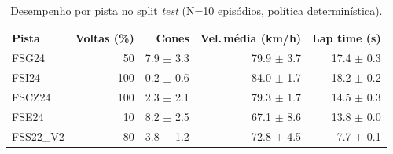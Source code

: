 \begin{table}[H]
\centering
\caption{Desempenho por pista no split \textit{test} (N=10 episódios, política determinística).}
\label{tab:per_track_test}
\begin{tabular}{lrrrr}
\toprule
\textbf{Pista} & \textbf{Voltas (\%)} & \textbf{Cones} & \textbf{Vel.\,m\'edia (km/h)} & \textbf{Lap time (s)} \\
\midrule
FSG24 & 50 & 7.9 $\pm$ 3.3 & 79.9 $\pm$ 3.7 & 17.4 $\pm$ 0.3 \\
FSI24 & 100 & 0.2 $\pm$ 0.6 & 84.0 $\pm$ 1.7 & 18.2 $\pm$ 0.2 \\
FSCZ24 & 100 & 2.3 $\pm$ 2.1 & 79.3 $\pm$ 1.7 & 14.5 $\pm$ 0.3 \\
FSE24 & 10 & 8.2 $\pm$ 2.5 & 67.1 $\pm$ 8.6 & 13.8 $\pm$ 0.0 \\
FSS22_V2 & 80 & 3.8 $\pm$ 1.2 & 72.8 $\pm$ 4.5 & 7.7 $\pm$ 0.1 \\
\bottomrule
\end{tabular}
\end{table}
